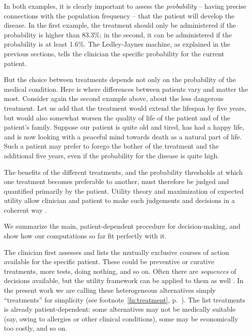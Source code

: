 \documentclass[utf8]{FrontiersinHarvard_mod} %
\renewcommand*{\|}[1][]{\nonscript\:#1\vert\nonscript\:\mathopen{}}
\newcommand*{\ljm}{Ledley-Jaynes machine}
\begin{document}
In both examples, it is clearly important to assess the \emph{probability} -- having precise connections with the population frequency -- that the patient will develop the disease. In the first example, the treatment should only be administered if the probability is higher than 83.3\%; in the second, it can be administered if the probability is at least 1.6\%. The \ljm, as explained in the previous sections, tells the clinician the specific probability for the current patient.

But the choice between treatments depends not only on the probability of the medical condition. Here is where differences between patients vary and matter the most. Consider again the second example above, about the less dangerous treatment. Let us add that the treatment would extend the lifespan by five years, but would also somewhat worsen the quality of life of the patient and of the patient's family. Suppose our patient is quite old and tired, has had a happy life, and is now looking with a peaceful mind towards death as a natural part of life. Such a patient may prefer to forego the bother of the treatment and the additional five years, even if the probability for the disease is quite high.

The benefits of the different treatments, and the probability thresholds at which one treatment becomes preferable to another, must therefore be judged and quantified primarily by the patient. Utility theory and maximization of expected utility allow clinician and patient to make such judgements and decisions in a coherent way \citetext{\citealt{soxetal1988_r2013,huninketal2001_r2014}; see also the clear and charming exposition by \citealt{lindley1971_r1988}, and \citealt{ohaganetal2006}}.

We summarize the main, patient-dependent procedure for decision-making, and show how our computations so far fit perfectly with it.

The clinician first assesses and lists the mutually exclusive courses of action available for the specific patient. These could be preventive or curative treatments, more tests, doing nothing, and so on. Often there are \emph{sequences} of decisions available, but the utility framework can be applied to them as well \citep[see references above and][]{raiffa1968_r1970}. In the present work we are calling these heterogeneous alternatives simply \enquote{treatments} for simplicity (see footnote~\ref{fn:treatment}, p.~\pageref{fn:treatment}). The list treatments is already patient-dependent: some alternatives may not be medically suitable (say, owing to allergies or other clinical conditions), some may be economically too costly, and so on.
\end{document}
